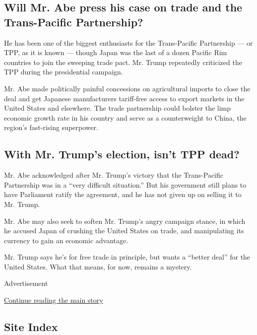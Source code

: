 \hypertarget{will-mr-abe-press-his-case-on-trade-and-the-trans-pacific-partnership}{%
\subsection{Will Mr. Abe press his case on trade and the Trans-Pacific
Partnership?}\label{will-mr-abe-press-his-case-on-trade-and-the-trans-pacific-partnership}}

He has been one of the biggest enthusiasts for the Trans-Pacific
Partnership --- or TPP, as it is known --- though Japan was the last of
a dozen Pacific Rim countries to join the sweeping trade pact. Mr. Trump
repeatedly criticized the TPP during the presidential campaign.

Mr. Abe made politically painful concessions on agricultural imports to
close the deal and get Japanese manufacturers tariff-free access to
export markets in the United States and elsewhere. The trade partnership
could bolster the limp economic growth rate in his country and serve as
a counterweight to China, the region's fast-rising superpower.

\hypertarget{with-mr-trumps-election-isnt-tpp-dead}{%
\subsection{With Mr. Trump's election, isn't TPP
dead?}\label{with-mr-trumps-election-isnt-tpp-dead}}

Mr. Abe acknowledged after Mr. Trump's victory that the Trans-Pacific
Partnership was in a ``very difficult situation.'' But his government
still plans to have Parliament ratify the agreement, and he has not
given up on selling it to Mr. Trump.

Mr. Abe may also seek to soften Mr. Trump's angry campaign stance, in
which he accused Japan of crushing the United States on trade, and
manipulating its currency to gain an economic advantage.

Mr. Trump says he's for free trade in principle, but wants a ``better
deal'' for the United States. What that means, for now, remains a
mystery.

Advertisement

\protect\hyperlink{after-bottom}{Continue reading the main story}

\hypertarget{site-index}{%
\subsection{Site Index}\label{site-index}}


